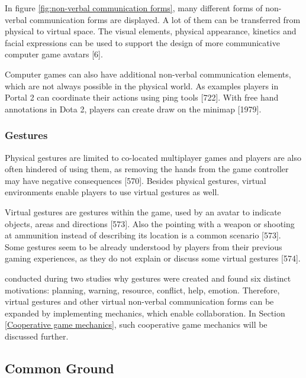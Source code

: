 In figure \ref{fig:non-verbal communication forms}, many different forms of non-verbal communication forms are displayed. A lot of them can be transferred from physical to virtual space. The visual elements, physical appearance, kinetics and facial expressions can be used to support the design of more communicative computer game avatars \autocite{Kujanpaa2003SupportingAvatars}[6].

Computer games can also have additional non-verbal communication elements, which are not always possible in the physical world. As examples players in Portal 2 can coordinate their actions using ping tools \autocite{Vaddi2015Validating2}[722]. With free hand annotations in Dota 2, players can create draw on the minimap \autocite{Wuertz2017Why2}[1979].


\subsubsection{Gestures}

Physical gestures are limited to co-located multiplayer games and players are also often hindered of using them, as removing the hands from the game controller may have negative consequences \autocite{Cheung2012CommunicationGaming}[570]. Besides physical gestures, virtual environments enable players to use virtual gestures as well.

Virtual gestures are gestures within the game, used by an avatar to indicate objects, areas and directions \autocite{Cheung2012CommunicationGaming}[573].
Also the pointing with a weapon or shooting at ammunition instead of describing its location is a common scenario \autocite{Cheung2012CommunicationGaming}[573]. Some gestures seem to be already understood by players from their previous gaming experiences, as they do not explain or discuss some virtual gestures \autocite{Cheung2012CommunicationGaming}[574].

\textcite{Wuertz2017Why2} conducted during two studies why gestures were created and found six distinct motivations: planning, warning, resource, conflict, help, emotion.
Therefore, virtual gestures and other virtual non-verbal communication forms can be expanded by implementing mechanics, which enable collaboration. In Section \ref{Cooperative game mechanics}, such cooperative game mechanics will be discussed further.

\subsection{Common Ground}
\label{section:Common Ground}

